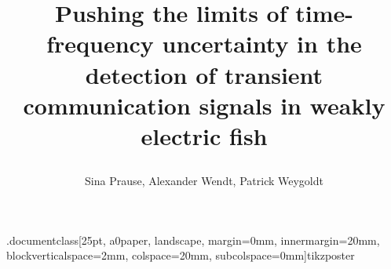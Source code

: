 .documentclass[25pt, a0paper, landscape, margin=0mm, innermargin=20mm,
blockverticalspace=2mm, colspace=20mm, subcolspace=0mm]{tikzposter} %






\renewcommand{\baselinestretch}{1}
\title{\parbox{1900pt}{Pushing the limits of time-frequency uncertainty in the
detection of transient communication signals in weakly electric fish}}
\author{Sina Prause, Alexander Wendt, Patrick Weygoldt}
\maketitle
\renewcommand{\baselinestretch}{1.4}

